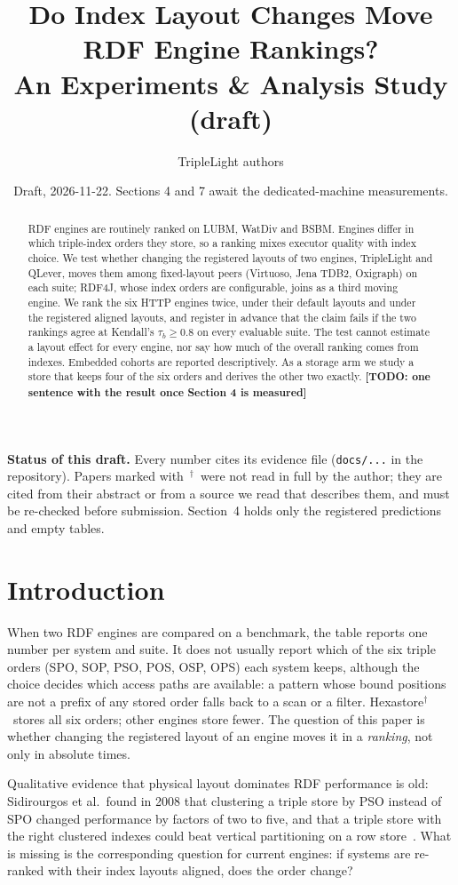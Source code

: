 \documentclass[11pt]{article}
\title{Do Index Layout Changes Move RDF Engine Rankings?\\\large An Experiments \& Analysis Study (draft)}
\author{TripleLight authors}
\date{Draft, 2026-11-22. Sections 4 and 7 await the dedicated-machine measurements.}
\newcommand{\todo}[1]{\textbf{[TODO: #1]}}
\newcommand{\unread}{$^{\dagger}$}
\begin{document}
\maketitle

\noindent\textbf{Status of this draft.}
Every number cites its evidence file (\texttt{docs/...} in the repository). Papers marked with~\unread\ were not read
in full by the author; they are cited from their abstract or from a source we read that describes them, and must be
re-checked before submission. Section~4 holds only the registered predictions and empty tables.

\begin{abstract}
RDF engines are routinely ranked on LUBM, WatDiv and BSBM. Engines differ in which triple-index orders they store, so a ranking
mixes executor quality with index choice. We test whether changing the registered layouts of two engines, TripleLight and QLever,
moves them among fixed-layout peers (Virtuoso, Jena TDB2, Oxigraph) on each suite; RDF4J, whose index orders are configurable, joins as a third moving engine. We rank the six HTTP engines twice, under their
default layouts and under the registered aligned layouts, and register in advance that the claim fails if the two rankings agree at
Kendall's $\tau_b \ge 0.8$ on every evaluable suite. The test cannot estimate a layout effect for every engine, nor say how much of
the overall ranking comes from indexes. Embedded cohorts are reported descriptively. As a storage arm we study a store that keeps four
of the six orders and derives the other two exactly. \todo{one sentence with the result once Section 4 is measured}
\end{abstract}

\section{Introduction}
When two RDF engines are compared on a benchmark, the table reports one number per system and suite. It does not usually
report which of the six triple orders (SPO, SOP, PSO, POS, OSP, OPS) each system keeps, although the choice decides
which access paths are available: a pattern whose bound positions are not a prefix of any stored order falls back to a
scan or a filter. Hexastore\unread\ stores all six orders; other engines store fewer. The question of this paper is whether
changing the registered layout of an engine moves it in a \emph{ranking}, not only in absolute times.

Qualitative evidence that physical layout dominates RDF performance is old: Sidirourgos et al.\ found in 2008 that
clustering a triple store by PSO instead of SPO changed performance by factors of two to five, and that a triple store with
the right clustered indexes could beat vertical partitioning on a row store~\cite{sidirourgos2008}. What is missing is the
corresponding question for current engines: if systems are re-ranked with their index layouts aligned, does the order
change?
\end{document}
